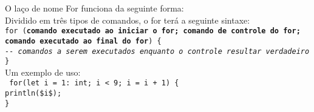 \documentclass[12pt,a4paper]{article}
\def\emph#1{\textbf{#1}} %
\begin{document}
O laço de nome For funciona da seguinte forma: \\

Dividido em três tipos de comandos, o for terá a seguinte sintaxe: \\

\noindent\texttt{for (\emph{comando executado ao iniciar o for; comando de controle do for; comando executado ao final do for}) \{\\
\indent\textit{-{}- comandos a serem executados enquanto o controle resultar verdadeiro} \\
\}}\\

Um exemplo de uso: \\[0.2cm]
\texttt{
\noindent for(let i = 1: int; i < 9; i = i + 1) \{\\
\indent println(\$i\$);\\
\noindent \}\\
}
\end{document}
